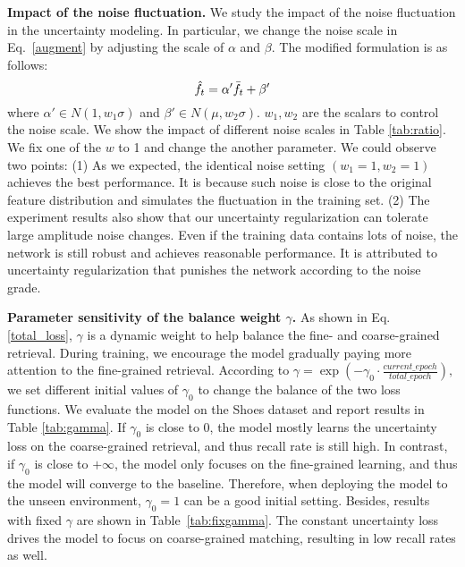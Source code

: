 \documentclass[10pt,twocolumn,letterpaper]{article}
\begin{document}
\noindent\textbf{Impact of the noise fluctuation.}
We study the impact of the noise fluctuation in the uncertainty modeling. In particular, we change the noise scale in Eq.~\ref{augment} by adjusting the scale of $\alpha$ and $\beta$. The modified formulation is as follows:\vspace{-2mm}
\begin{equation}
\hat{f}_t =  \alpha' \bar{f_t} + \beta' 
\vspace{-2mm}
\end{equation}
where $\alpha'\in N(1, w_1 \sigma)$ and $\beta'\in N(\mu,w_2 \sigma)$. $w_1, w_2$ are the scalars to control the noise scale. 
We show the impact of different noise scales in Table \ref{tab:ratio}. We fix one of the $w$ to 1 and change the another parameter.
We could observe two points: (1) As we expected, the identical noise setting $(w_1=1, w_2=1)$ achieves the best performance. It is because such noise is close to the original feature distribution and simulates the fluctuation in the training set. 
(2) The experiment results also show that our uncertainty regularization can tolerate large amplitude noise changes. Even if the training data contains lots of noise, the network is still robust and achieves reasonable performance. It is attributed to uncertainty regularization that punishes the network according to the noise grade.

\noindent\textbf{Parameter sensitivity of the balance weight $\gamma$.} 
As shown in Eq. \ref{total_loss}, $\gamma$ is a dynamic weight to help balance the fine- and coarse-grained retrieval. During training, we encourage the model gradually paying more attention to the fine-grained retrieval. According to $\gamma=\exp(-\gamma_0\cdot \frac{current\_epoch}{total\_epoch} ),$ we set different initial values of $\gamma_0$ to change the balance of the two loss functions. 
We evaluate the model on the Shoes dataset and report results in Table \ref{tab:gamma}. 
If $\gamma_0$ is close to $0$, the model mostly learns the uncertainty loss on the coarse-grained retrieval, and thus recall rate is still high. In contrast, if $\gamma_0$ is close to $+\infty$, the model only focuses on the fine-grained learning, and thus the model will converge to the baseline. Therefore, when deploying the model to the unseen environment, $\gamma_0 = 1$ can be a good initial setting. Besides, results with fixed $\gamma$ are shown in Table~\ref{tab:fixgamma}. The constant uncertainty loss drives the model to focus on coarse-grained matching, resulting in low recall rates as well.
\end{document}
